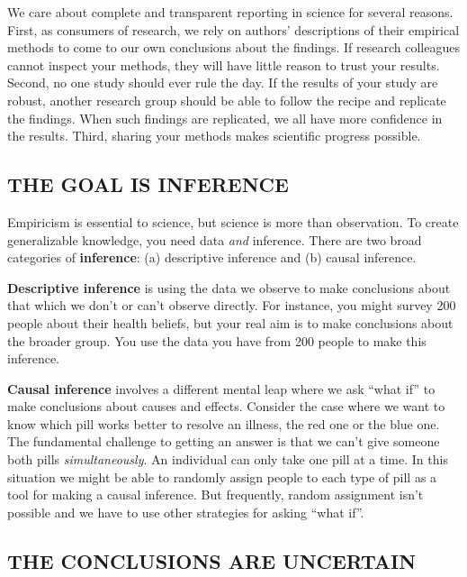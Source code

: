 \documentclass[
  letterpaper,
  DIV=11,
  numbers=noendperiod,
  oneside]{scrreprt}
\begin{document}
We care about complete and transparent reporting in science for several
reasons. First, as consumers of research, we rely on authors'
descriptions of their empirical methods to come to our own conclusions
about the findings. If research colleagues cannot inspect your methods,
they will have little reason to trust your results. Second, no one study
should ever rule the day. If the results of your study are robust,
another research group should be able to follow the recipe and replicate
the findings. When such findings are replicated, we all have more
confidence in the results. Third, sharing your methods makes scientific
progress possible.

\hypertarget{the-goal-is-inference}{%
\subsection*{THE GOAL IS INFERENCE}\label{the-goal-is-inference}}

Empiricism is essential to science, but science is more than
observation. To create generalizable knowledge, you need data \emph{and}
inference. There are two broad categories of \textbf{inference}: (a)
descriptive inference and (b) causal inference.

\textbf{Descriptive inference} is using the data we observe to make
conclusions about that which we don't or can't observe directly. For
instance, you might survey 200 people about their health beliefs, but
your real aim is to make conclusions about the broader group. You use
the data you have from 200 people to make this inference.

\textbf{Causal inference} involves a different mental leap where we ask
``what if'' to make conclusions about causes and effects. Consider the
case where we want to know which pill works better to resolve an
illness, the red one or the blue one. The fundamental challenge to
getting an answer is that we can't give someone both pills
\emph{simultaneously}. An individual can only take one pill at a time.
In this situation we might be able to randomly assign people to each
type of pill as a tool for making a causal inference. But frequently,
random assignment isn't possible and we have to use other strategies for
asking ``what if''.

\hypertarget{the-conclusions-are-uncertain}{%
\subsection*{THE CONCLUSIONS ARE
UNCERTAIN}\label{the-conclusions-are-uncertain}}
\end{document}
